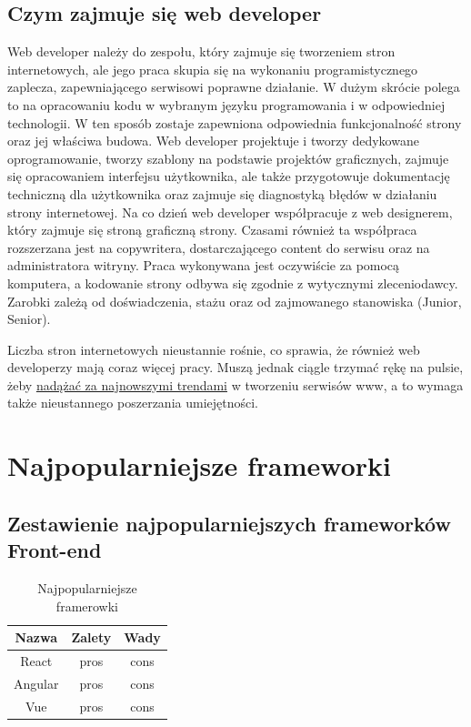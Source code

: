 \documentclass[12pt]{report}
\begin{document}
	\newpage
	\section{Czym zajmuje się web developer}
	Web developer należy do zespołu, który zajmuje się tworzeniem stron internetowych, ale jego praca skupia się na wykonaniu programistycznego zaplecza, zapewniającego serwisowi poprawne działanie. W dużym skrócie polega to na opracowaniu kodu w wybranym języku programowania i w odpowiedniej technologii. W ten sposób zostaje zapewniona odpowiednia funkcjonalność strony oraz jej właściwa budowa. Web developer projektuje i tworzy dedykowane oprogramowanie, tworzy szablony na podstawie projektów graficznych, zajmuje się opracowaniem interfejsu użytkownika, ale także przygotowuje dokumentację techniczną dla użytkownika oraz zajmuje się diagnostyką błędów w działaniu strony internetowej.
	Na co dzień web developer współpracuje z web designerem, który zajmuje się stroną graficzną strony. Czasami również ta współpraca rozszerzana jest na copywritera, dostarczającego content do serwisu oraz na administratora witryny. Praca wykonywana jest oczywiście za pomocą komputera, a kodowanie strony odbywa się zgodnie z wytycznymi zleceniodawcy. Zarobki zależą od doświadczenia, stażu oraz od zajmowanego stanowiska (Junior, Senior). 
	\par
	Liczba stron internetowych nieustannie rośnie, co sprawia, że również web developerzy mają coraz więcej pracy. Muszą jednak ciągle trzymać rękę na pulsie, żeby \underline{nadążać za najnowszymi trendami} w tworzeniu serwisów www, a to wymaga także nieustannego poszerzania umiejętności.
	\cite{webd}
	
	\chapter{Najpopularniejsze frameworki}
	\section{Zestawienie najpopularniejszych frameworków Front-end}
	
	
	\begin{table}[h]
	\centering
	\begin{tabular}{|c|c|c|} 
	\hline
	Nazwa & Zalety & Wady \\ 
	\hline
	React &
	pros
	  &
	cons \\ 
	\hline
	 Angular & pros & cons \\
	 \hline
	 Vue & pros & cons \\
	 
	\hline
	\end{tabular}
	\caption{Najpopularniejsze framerowki}
	\end{table}
	

	\listoffigures
	
\end{document}

